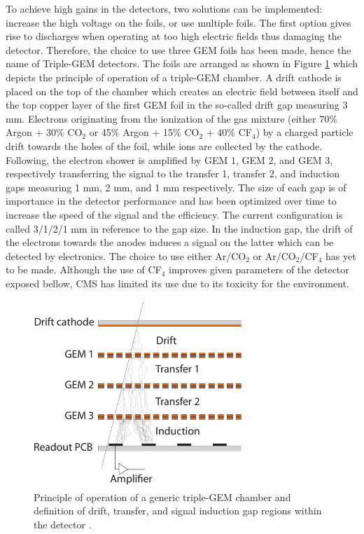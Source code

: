     To achieve high gains in the detectors, two solutions can be implemented: increase the high voltage on the foils, or use multiple foils. The first option gives rise to discharges when operating at too high electric fields thus damaging the detector. Therefore, the choice to use three GEM foils has been made, hence the name of Triple-GEM detectors. The foils are arranged as shown in Figure \ref{fig:II-1-triple} which depicts the principle of operation of a triple-GEM chamber. A drift cathode is placed on the top of the chamber which creates an electric field between itself and the top copper layer of the first GEM foil in the so-called drift gap measuring 3 mm. Electrons originating from the ionization of the gas mixture (either 70\% Argon + 30\% CO$_2$ or 45\% Argon + 15\% CO$_2$ + 40\% CF$_4$) by a charged particle drift towards the holes of the foil, while ions are collected by the cathode. Following, the electron shower is amplified by GEM 1, GEM 2, and GEM 3, respectively transferring the signal to the transfer 1, transfer 2, and induction gaps measuring 1 mm, 2 mm, and 1 mm respectively. The size of each gap is of importance in the detector performance and has been optimized over time to increase the speed of the signal and the efficiency. The current configuration is called 3/1/2/1 mm in reference to the gap size. In the induction gap, the drift of the electrons towards the anodes induces a signal on the latter which can be detected by electronics. The choice to use either Ar/CO$_2$ or Ar/CO$_2$/CF$_4$ has yet to be made. Although the use of CF$_4$ improves given parameters of the detector exposed bellow, CMS has limited its use due to its toxicity for the environment. \\

    \begin{figure}[t!]
      \centering
      \includegraphics[width=0.7\textwidth]{img/II-1-gem/triple-gem-foils.pdf}
      \caption{Principle of operation of a generic triple-GEM chamber and definition of drift, transfer, and signal induction gap regions within the detector \cite{Colaleo:2021453}.}
      \label{fig:II-1-triple}
    \end{figure}

